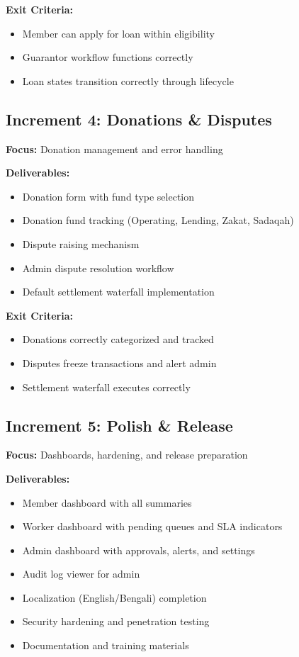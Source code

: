 \documentclass[11pt,a4paper]{article}
\begin{document}
\textbf{Exit Criteria:}
\begin{itemize}
    \item Member can apply for loan within eligibility
    \item Guarantor workflow functions correctly
    \item Loan states transition correctly through lifecycle
\end{itemize}

\subsection{Increment 4: Donations \& Disputes}

\textbf{Focus:} Donation management and error handling

\textbf{Deliverables:}
\begin{itemize}
    \item Donation form with fund type selection
    \item Donation fund tracking (Operating, Lending, Zakat, Sadaqah)
    \item Dispute raising mechanism
    \item Admin dispute resolution workflow
    \item Default settlement waterfall implementation
\end{itemize}

\textbf{Exit Criteria:}
\begin{itemize}
    \item Donations correctly categorized and tracked
    \item Disputes freeze transactions and alert admin
    \item Settlement waterfall executes correctly
\end{itemize}

\subsection{Increment 5: Polish \& Release}

\textbf{Focus:} Dashboards, hardening, and release preparation

\textbf{Deliverables:}
\begin{itemize}
    \item Member dashboard with all summaries
    \item Worker dashboard with pending queues and SLA indicators
    \item Admin dashboard with approvals, alerts, and settings
    \item Audit log viewer for admin
    \item Localization (English/Bengali) completion
    \item Security hardening and penetration testing
    \item Documentation and training materials
\end{itemize}
\end{document}
